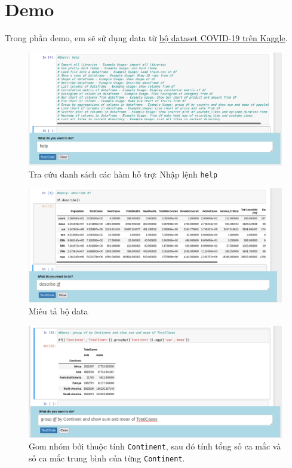 \documentclass[12pt]{article}
\begin{document}
\section{Demo}
Trong phần demo, em sẽ sử dụng data từ  \href{https://www.kaggle.com/datasets/imdevskp/corona-virus-report}{bộ dataset COVID-19 trên Kaggle}.
\begin{figure}[H]
    \centering
    \includegraphics[scale=0.6]{img/help.PNG}
    \caption{Tra cứu danh sách các hàm hỗ trợ: Nhập lệnh \texttt{help}}
\end{figure}
\begin{figure}[H]
    \centering
    \includegraphics[scale=0.6]{img/describe.PNG}
    \caption{Miêu tả bộ data}
\end{figure}
\begin{figure}[H]
    \centering
    \includegraphics[scale=0.6]{img/complex.PNG}
    \caption{Gom nhóm bởi thuộc tính \texttt{Continent}, sau đó tính tổng số ca mắc và số ca mắc trung bình của từng \texttt{Continent}.}
\end{figure}
\end{document}
